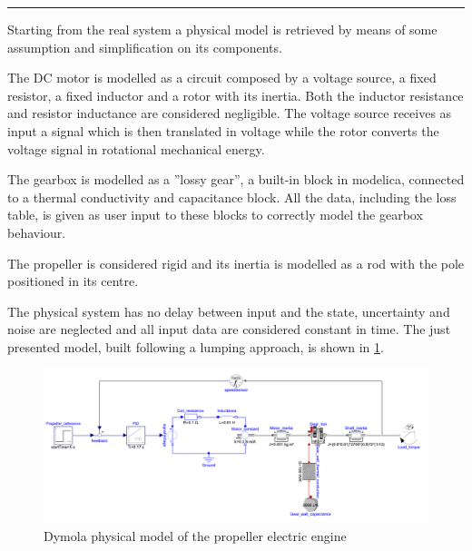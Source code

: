 \documentclass[11pt,a4paper,oneside]{article}
\begin{document}
\medskip
\medskip \hrule \medskip
{}
\clearpage

Starting from the real system a physical model is retrieved by means of some assumption and simplification on its components. 

The DC motor is modelled as a circuit composed by a voltage source, a fixed resistor, a fixed inductor and a rotor with its inertia.
Both the inductor resistance and resistor inductance are considered negligible.
The voltage source receives as input a signal which is then translated in voltage while the rotor converts the voltage signal in rotational mechanical energy.

The gearbox is modelled as a ''lossy gear'', a built-in block in modelica, connected to a thermal conductivity and capacitance block.
All the data, including the loss table, is given as user input to these blocks to correctly model the gearbox behaviour.

The propeller is considered rigid and its inertia is modelled as a rod with the pole positioned in its centre.

The physical system has no delay between input and the state, uncertainty and noise are neglected and all input data are considered constant in time. 
The just presented model, built following a lumping approach, is shown in \cref{fig:ex2a_droneModel}.
\begin{figure}[H]
    \centering
    \includegraphics*[width=1\textwidth, keepaspectratio]{Figures/ex2a_blockDiag.pdf}
    \caption[]{\label{fig:ex2a_droneModel} Dymola physical model of the propeller electric engine}
\end{figure}
\end{document}
